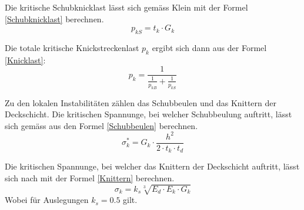     Die kritische Schubknicklast lässt sich gemäss Klein \cite{klein} mit der Formel \ref{Schubknicklast} berechnen.
    \begin{equation}
      \label{Schubknicklast}
      p_{kS} = t_k \cdot G_k
    \end{equation}

    Die totale kritische Knickstreckenlast \(p_k\) ergibt sich dann aus der Formel \ref{Knicklast}:
    \begin{equation}
      \label{Knicklast}
      p_k=\frac{1}{\frac{1}{p_{kB}}+\frac{1}{p_{kS}}}
    \end{equation}

    Zu den lokalen Instabilitäten zählen das Schubbeulen und das Knittern der Deckschicht. Die kritischen Spannunge, bei welcher Schubbeulung auftritt, lässt sich gemäss \cite{ETH} aus den Formel \ref{Schubbeulen} berechnen.
    \begin{equation}
      \label{Schubbeulen}
      \sigma_k^* = G_k \cdot \frac{h^2}{2 \cdot t_k \cdot t_d}
    \end{equation}

    Die kritischen Spannunge, bei welcher das Knittern der Deckschicht auftritt, lässt sich nach \cite{ETH} mit der Formel \ref{Knittern} berechnen.
    \begin{equation}
      \label{Knittern}
      \sigma_k = k_s\sqrt[3]{E_d \cdot E_k \cdot G_k}
    \end{equation}
    Wobei für Auslegungen \(k_s = 0.5\) gilt.


